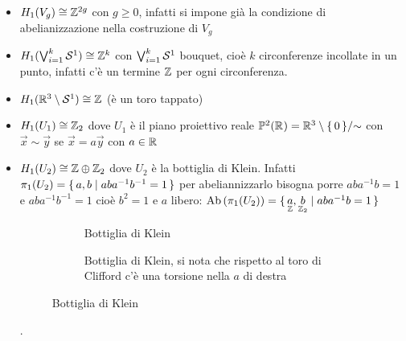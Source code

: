\begin{example} \hfill
  \begin{itemize}
  \item $ H_1(V_g) \cong \mathbb{Z}^{2g} $ con $ g \geq 0 $, infatti si impone già la condizione di abelianizzazione nella costruzione di $ V_g $
  \item $ H_1(\bigvee_{i=1}^{k}\mathcal{S}^{1}) \cong \mathbb{Z}^k $ con $ \bigvee_{i=1}^{k}\mathcal{S}^{1} $ bouquet, cioè $ k $ circonferenze incollate in un punto,
    infatti c'è un termine $ \mathbb{Z} $ per ogni circonferenza.
  \item $ H_1(\mathbb{R}^{3} \setminus \mathcal{S}^{1}) \cong \mathbb{Z} $ (è un toro tappato)
  \item $ H_1(U_1) \cong \mathbb{Z}_2 $ dove $ U_1 $ è il piano proiettivo reale $ \mathbb{P}^2(\mathbb{R}^{}) = {\mathbb{R}^{3} \setminus \set{0}} \slash {\sim} $
    con $ \vec{x} \sim \vec{y} $ se $ \vec{x} = a \vec{y} $ con $ a \in \mathbb{R}^{} $
  \item $ H_1(U_2) \cong \mathbb{Z} \oplus \mathbb{Z}_2 $ dove $ U_2 $ è la bottiglia di Klein.
    Infatti $ \pi_1(U_2) = \set{a, b | aba^{-1}b^{-1} = 1} $ per abeliannizzarlo bisogna
    porre $ aba^{-1}b = 1 $ e $ aba^{-1}b^{-1} = 1 $ cioè $ b^2 = 1 $ e $ a $ libero:
    $ \mathrm{Ab}\left( \pi_1(U_2) \right) = \set{\underset{\mathbb{Z}}{a}, \underset{\mathbb{Z}_2}{b} |  aba^{-1}b = 1 } $
    \begin{figure}[htbp]
      \centering
      \begin{subfigure}{.5\textwidth}
        \centering
        \def\svgwidth{0.26\textwidth}
        
        \caption{Bottiglia di Klein}
      \end{subfigure}%
      \begin{subfigure}{.5\textwidth}
        \centering
        \caption{Bottiglia di Klein, si nota che rispetto al toro di Clifford c'è
          una torsione nella $ a $ di destra}
      \end{subfigure}
      \caption{Bottiglia di Klein}
      \label{fig:lez3:klein_bottle}
    \end{figure}.
  \end{itemize}
\end{example}

